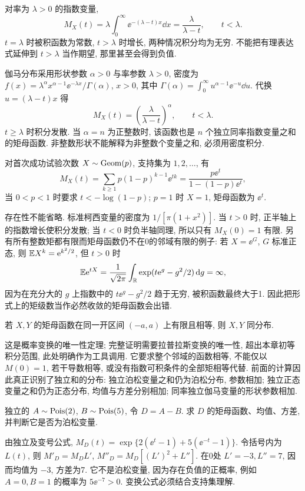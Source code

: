 对率为 $\lambda>0$ 的指数变量,
\[M_X(t)=\lambda\int_0^\infty\ee^{-(\lambda-t)x}\dd x
=\frac{\lambda}{\lambda-t},\qquad t<\lambda.\]
$t=\lambda$ 时被积函数为常数, $t>\lambda$ 时增长, 两种情况积分均为无穷. 不能把有理表达式延伸到 $t>\lambda$ 当作期望, 那里甚至会得到负值.

伽马分布采用形状参数 $\alpha>0$ 与率参数 $\lambda>0$, 密度为
$f(x)=\lambda^\alpha x^{\alpha-1}\ee^{-\lambda x}/\Gamma(\alpha)$, $x>0$, 其中 $\Gamma(\alpha)=\int_0^\infty u^{\alpha-1}\ee^{-u}\dd u$. 代换 $u=(\lambda-t)x$ 得
\[M_X(t)=\left(\frac{\lambda}{\lambda-t}\right)^\alpha,\qquad t<\lambda.\]
$t\ge\lambda$ 时积分发散. 当 $\alpha=n$ 为正整数时, 该函数也是 $n$ 个独立同率指数变量之和的矩母函数. 非整数形状不能解释为非整数个变量之和, 必须用密度积分.

对首次成功试验次数 $X\sim\operatorname{Geom}(p)$, 支持集为 $1,2,\ldots$, 有
\[M_X(t)=\sum_{k\ge1}p(1-p)^{k-1}\ee^{tk}
=\frac{p\ee^t}{1-(1-p)\ee^t},\]
当 $0<p<1$ 时要求 $t<-\log(1-p)$; $p=1$ 时 $X=1$, 矩母函数为 $\ee^t$.

存在性不能省略. 标准柯西变量的密度为 $1/[\pi(1+x^2)]$. 当 $t>0$ 时, 正半轴上的指数增长使积分发散; 当 $t<0$ 时负半轴同理, 所以只有 $M_X(0)=1$ 有限. 另有所有整数矩都有限而矩母函数仍不在0的邻域有限的例子: 若 $X=\ee^G$, $G$ 标准正态, 则 $\mathbb E X^k=\mathrm e^{k^2/2}$, 但 $t>0$ 时
\[\mathbb E\mathrm e^{tX}=\frac1{\sqrt{2\pi}}\int_\mathbb R\exp(t\mathrm e^g-g^2/2)\,\mathrm d g=\infty,\]
因为在充分大的 $g$ 上指数中的 $t\ee^g-g^2/2$ 趋于无穷, 被积函数最终大于1. 因此把形式上的矩级数当作必然收敛的矩母函数会出错.

\begin{theorem}
若 $X,Y$ 的矩母函数在同一开区间 $(-a,a)$ 上有限且相等, 则 $X,Y$ 同分布.
\end{theorem}
这是概率变换的唯一性定理; 完整证明需要拉普拉斯变换的唯一性, 超出本章初等积分范围, 此处明确作为工具调用. 它要求整个邻域的函数相等, 不能仅以 $M(0)=1$, 若干导数相等, 或没有指数可积条件的全部矩相等代替. 前面的计算因此真正识别了独立和的分布: 独立泊松变量之和仍为泊松分布, 参数相加; 独立正态变量之和仍为正态分布, 均值与方差分别相加; 同率独立伽马变量的形状参数相加.
\begin{exercise}
独立的 $A\sim\operatorname{Pois}(2)$, $B\sim\operatorname{Pois}(5)$, 令 $D=A-B$. 求 $D$ 的矩母函数、均值、方差, 并判断它是否为泊松变量.
\end{exercise}
\begin{solution}
由独立及变号公式,
$M_D(t)=\exp\{2(\ee^t-1)+5(\ee^{-t}-1)\}$.
令括号内为 $L(t)$, 则 $M'_D=M_DL'$, $M''_D=M_D[(L')^2+L'']$. 在0处 $L'=-3,L''=7$, 因而均值为 $-3$, 方差为7. 它不是泊松变量, 因为存在负值的正概率, 例如 $A=0,B=1$ 的概率为 $5\ee^{-7}>0$. 变换公式必须结合支持集理解.
\end{solution}

